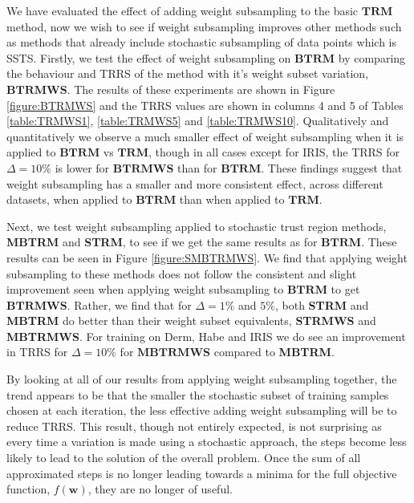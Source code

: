 \documentclass[letterpaper,12pt,titlepage,oneside,final]{book}
\begin{document}
	We have evaluated the effect of adding weight subsampling to the basic $\mathbf{TRM}$ method, now we wish to see if weight subsampling improves other methods such as methods that already include stochastic subsampling of data points which is SSTS. Firstly, we test the effect of weight subsampling on $\mathbf{BTRM}$ by comparing the behaviour and TRRS of the method with it's weight subset variation, $\mathbf{BTRMWS}$. The results of these experiments are shown in Figure \ref{figure:BTRMWS} and the TRRS values are shown in columns 4 and 5 of Tables \ref{table:TRMWS1}, \ref{table:TRMWS5} and \ref{table:TRMWS10}. Qualitatively and quantitatively we observe a much smaller effect of weight subsampling when it is applied to $\mathbf{BTRM}$ vs $\mathbf{TRM}$, though in all cases except for IRIS, the TRRS for $\Delta=10\%$ is lower for $\mathbf{BTRMWS}$ than for $\mathbf{BTRM}$. These findings suggest that weight subsampling has a smaller and more consistent effect, across different datasets, when applied to $\mathbf{BTRM}$ than when applied to $\mathbf{TRM}$. 
	
	Next, we test weight subsampling applied to stochastic trust region methods, \textbf{MBTRM} and \textbf{STRM}, to see if we get the same results as for $\mathbf{BTRM}$. These results can be seen in Figure \ref{figure:SMBTRMWS}. We find that applying weight subsampling to these methods does not follow the consistent and slight improvement seen when applying weight subsampling to $\mathbf{BTRM}$ to get $\mathbf{BTRMWS}$. Rather, we find that for $\Delta=1 \%$ and $5\%$, both \textbf{STRM} and \textbf{MBTRM} do better than their weight subset equivalents, \textbf{STRMWS} and \textbf{MBTRMWS}. For training on Derm, Habe and IRIS we do see an improvement in TRRS for $\Delta=10\%$ for $\mathbf{MBTRMWS}$ compared to \textbf{MBTRM}. 
	
	By looking at all of our results from applying weight subsampling together, the trend appears to be that the smaller the stochastic subset of training samples chosen at each iteration, the less effective adding weight subsampling will be to reduce TRRS. This result, though not entirely expected, is not surprising as every time a variation is made using a stochastic approach, the steps become less likely to lead to the solution of the overall problem. Once the sum of all approximated steps is no longer leading towards a minima for the full objective function, $f(\mathbf{w})$, they are no longer of useful.
	
\end{document}

